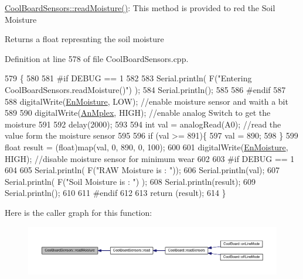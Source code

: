 \hyperlink{class_cool_board_sensors_a8761bff50373c485f4465c8db47d0633}{Cool\+Board\+Sensors\+::read\+Moisture()}\+: This method is provided to red the Soil Moisture

\begin{DoxyReturn}{Returns}
a float represnting the soil moisture 
\end{DoxyReturn}


Definition at line 578 of file Cool\+Board\+Sensors.\+cpp.


\begin{DoxyCode}
579 \{
580 
581 \textcolor{preprocessor}{#if DEBUG == 1}
582     
583     Serial.println( F(\textcolor{stringliteral}{"Entering CoolBoardSensors.readMoisture()"}) );
584     Serial.println();
585     
586 \textcolor{preprocessor}{#endif}
587 
588     digitalWrite(\hyperlink{class_cool_board_sensors_a6177d02e14a057a2f171a2e930b5038d}{EnMoisture}, LOW);                 \textcolor{comment}{//enable moisture sensor and waith a bit}
589 
590     digitalWrite(\hyperlink{class_cool_board_sensors_a12ef28b1046219e0aee10bf64e28c4a5}{AnMplex}, HIGH);         \textcolor{comment}{//enable analog Switch to get the moisture}
591 
592     delay(2000);
593 
594     \textcolor{keywordtype}{int} val = analogRead(A0);                       \textcolor{comment}{//read the value form the moisture sensor}
595 
596     \textcolor{keywordflow}{if} (val >= 891)\{
597         val = 890;
598     \}
599     \textcolor{keywordtype}{float} result = (float)map(val, 0, 890, 0, 100); 
600 
601     digitalWrite(\hyperlink{class_cool_board_sensors_a6177d02e14a057a2f171a2e930b5038d}{EnMoisture}, HIGH);                  \textcolor{comment}{//disable moisture sensor for minimum wear}
602     
603 \textcolor{preprocessor}{#if DEBUG == 1 }
604 
605     Serial.println( F(\textcolor{stringliteral}{"RAW Moisture  is : "}));
606     Serial.println(val);
607     Serial.println( F(\textcolor{stringliteral}{"Soil Moisture is : "}) );
608     Serial.println(result);
609     Serial.println();
610 
611 \textcolor{preprocessor}{#endif }
612 
613     \textcolor{keywordflow}{return} (result);
614 \}
\end{DoxyCode}
Here is the caller graph for this function\+:\nopagebreak
\begin{figure}[H]
\begin{center}
\leavevmode
\includegraphics[width=350pt]{de/d46/class_cool_board_sensors_a8761bff50373c485f4465c8db47d0633_icgraph}
\end{center}
\end{figure}
\mbox{\label{class_cool_board_sensors_a6944b6ea7bce8e2fce1b434acfd9d5f3}} 
